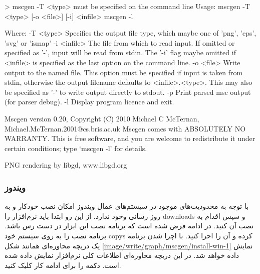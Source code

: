 \begin{Shell}
> mscgen
-T <type> must be specified on the command line                                                         
Usage: mscgen -T <type> [-o <file>] [-i] <infile>                                                       
       mscgen -l                                                                                        

Where:                                                                                                  
 -T <type>   Specifies the output file type, which maybe one of 'png', 'eps',
             'svg' or 'ismap'
 -i <infile> The file from which to read input.  If omitted or specified as
              '-', input will be read from stdin.  The '-i' flag maybe
              omitted if <infile> is specified as the last option on the
              command line.
 -o <file>   Write output to the named file.  This option must be specified if 
              input is taken from stdin, otherwise the output filename
              defaults to <infile>.<type>.  This may also be specified as '-'
              to write output directly to stdout.
 -p          Print parsed msc output (for parser debug).
 -l          Display program licence and exit.

Mscgen version 0.20, Copyright (C) 2010 Michael C McTernan,
                                        Michael.McTernan.2001@cs.bris.ac.uk
Mscgen comes with ABSOLUTELY NO WARRANTY.  This is free software, and you are
welcome to redistribute it under certain conditions; type `mscgen -l' for
details.

PNG rendering by libgd, www.libgd.org
\end{Shell}

\subsubsection{ویندوز}

با توجه به محدودیت‌های موجود در سیستم‌های عمال ویندوز امکان نصب خودکار و به روز
رسانی وحود ندارد. از این رو ابتدا باید نرم‌افزار را \glspl{download} و سپس اقدام
به نصب آن کنید. در ادامه فرض شده است که برنامه نصب این ابزار در دست رس باشد.
برنامه نصب را به روی سیستم خود \glspl{copy} کرده و آن را احرا کنید. با اچرا شدن
برنامه یک دریچه محاوره‌ای همانند شکل \ref{image/write/graph/mscgen/install-win-1}
نمایش داده خواهد شد.
در این دریچه محاوره‌ای اطلاعات کلی نرم‌افزار نمایش داده شده است. دکمه 
را برای ادامه کار کلیک کنید.

